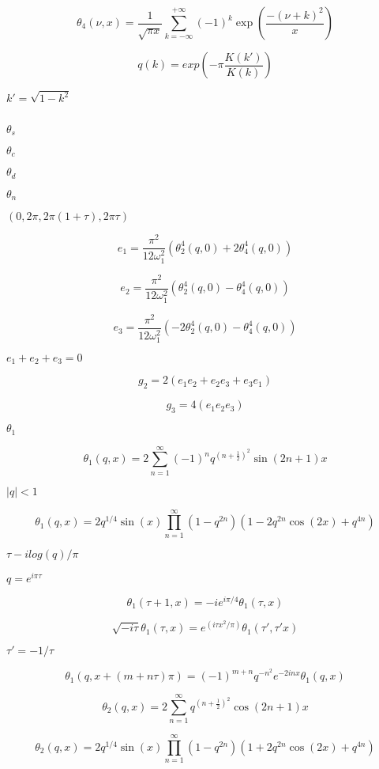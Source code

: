 \documentclass{article}
\begin{document}
\[ \theta_4(\nu,x) = \frac{1}{\sqrt{\pi x}} \sum_{k=-\infty}^{+\infty} (-1)^k \exp\left( \frac{-(\nu + k)^2}{x} \right) \]
\pagebreak

\[ q(k) = exp\left(-\pi\frac{K(k')}{K(k)}\right) \]
\pagebreak

$ k' = \sqrt{1 - k^2} $
\pagebreak

$ $
\pagebreak

$ \theta_s $
\pagebreak

$ \theta_c $
\pagebreak

$ \theta_d $
\pagebreak

$ \theta_n $
\pagebreak

$ (0, 2\pi, 2\pi (1 + \tau), 2\pi \tau) $
\pagebreak

\[ e_1 = \frac{\pi^2}{12\omega_1^2}(\theta_2^4(q,0) + 2\theta_4^4(q,0)) \]
\pagebreak

\[ e_2 = \frac{\pi^2}{12\omega_1^2}(\theta_2^4(q,0) - \theta_4^4(q,0)) \]
\pagebreak

\[ e_3 = \frac{\pi^2}{12\omega_1^2}(-2\theta_2^4(q,0) - \theta_4^4(q,0)) \]
\pagebreak

$ e_1 + e_2 + e_3 = 0 $
\pagebreak

\[ g_2 = 2(e_1 e_2 + e_2 e_3 + e_3 e_1) \]
\pagebreak

\[ g_3 = 4(e_1 e_2 e_3) \]
\pagebreak

$ \theta_1 $
\pagebreak

\[ \theta_1(q,x) = 2\sum_{n=1}^{\infty}(-1)^n q^{(n+\frac{1}{2})^2}\sin{(2n+1)x} \]
\pagebreak

$ |q| < 1 $
\pagebreak

\[ \theta_1(q,x) = 2 q^{1/4} \sin(x) \prod_{n=1}^{\infty} (1 - q^{2n})(1 - 2q^{2n}\cos(2x) + q^{4n}) \]
\pagebreak

$ \tau -i log(q)/ \pi $
\pagebreak

$ q = e^{i\pi\tau} $
\pagebreak

\[ \theta_1(\tau+1,x) = -i e^{i\pi/4}\theta_1(\tau,x) \]
\pagebreak

\[ \sqrt{-i\tau}\theta_1(\tau,x) = e^{(i\tau x^2/\pi)}\theta_1(\tau',\tau' x) \]
\pagebreak

$ \tau' = -1/\tau $
\pagebreak

\[ \theta_1(q, x+(m+n\tau)\pi) = (-1)^{m+n}q^{-n^2}e^{-2inx}\theta_1(q, x) \]
\pagebreak

\[ \theta_2(q,x) = 2\sum_{n=1}^{\infty} q^{(n+\frac{1}{2})^2}\cos{(2n+1)x} \]
\pagebreak

\[ \theta_2(q,x) = 2 q^{1/4} \sin(x) \prod_{n=1}^{\infty} (1 - q^{2n})(1 + 2q^{2n}\cos(2x) + q^{4n}) \]
\pagebreak
\end{document}
